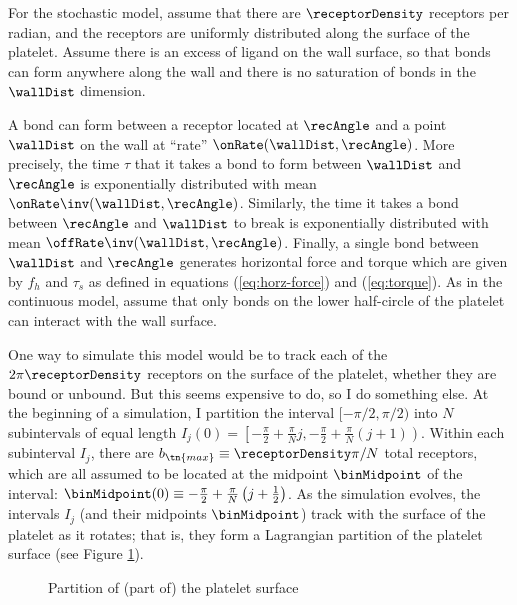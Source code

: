 For the stochastic model, assume that there are $\receptorDensity$ receptors per
radian, and the receptors are uniformly distributed along the surface
of the platelet. Assume there is an excess of ligand on the wall
surface, so that bonds can form anywhere along the wall and there is
no saturation of bonds in the $\wallDist$ dimension.

A bond can form between a receptor located at $\recAngle$ and a point
$\wallDist$ on the wall at ``rate'' $\onRate(\wallDist,
\recAngle)$. More precisely, the time $\tau$ that it takes a bond to
form between $\wallDist$ and $\recAngle$ is exponentially distributed
with mean $\onRate\inv(\wallDist, \recAngle)$. Similarly, the time it
takes a bond between $\recAngle$ and $\wallDist$ to break is
exponentially distributed with mean
$\offRate\inv(\wallDist, \recAngle)$. Finally, a single bond between
$\wallDist$ and $\recAngle$ generates horizontal force and torque
which are given by $f_h$ and $\tau_s$ as defined in equations
(\ref{eq:horz-force}) and (\ref{eq:torque}). As in the continuous
model, assume that only bonds on the lower half-circle of the platelet
can interact with the wall surface.

One way to simulate this model would be to track each of the
$2\pi \receptorDensity$ receptors on the surface of the platelet,
whether they are bound or unbound. But this seems expensive to do, so
I do something else. At the beginning of a simulation, I partition the
interval $[-\pi/2, \pi/2)$ into $N$ subintervals of equal length
$I_j(0) = \left[-\frac{\pi}{2} + \frac{\pi}{N}j, -\frac{\pi}{2} +
  \frac{\pi}{N} (j+1)\right)$. Within each subinterval $I_j$, there
are $b_\tn{max} \equiv \receptorDensity \pi/N$ total receptors, which
are all assumed to be located at the midpoint $\binMidpoint$ of the
interval: $\binMidpoint(0) \equiv -\frac{\pi}{2} + \frac{\pi}{N}
\left( j + \frac{1}{2} \right)$. As the simulation evolves, the
intervals $I_j$ (and their midpoints $\binMidpoint$) track with the
surface of the platelet as it rotates; that is, they form a Lagrangian
partition of the platelet surface (see Figure \ref{fig:plt-bins}).

\begin{figure}
  \centering
  \caption{Partition of (part of) the platelet surface}
  \label{fig:plt-bins}
\end{figure}

